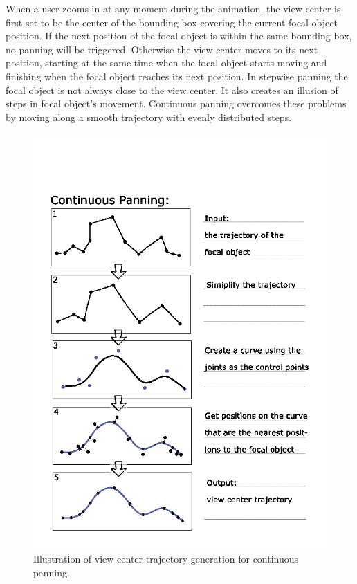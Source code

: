 \documentclass[review]{vgtc}                 %
\begin{document}
When a user zooms in at any moment during the animation, the view center is first set to be the center of the bounding box covering the current focal object position. If the next position of the focal object is within the same bounding box, no panning will be triggered. Otherwise the view center moves to its next position, starting at the same time when the focal object starts moving and finishing when the focal object reaches its next position. In stepwise panning the focal object is not always close to the view center. It also creates an illusion of steps in focal object's movement. Continuous panning overcomes these problems by moving along a smooth trajectory with evenly distributed steps.

\begin{figure}[t]
\centering
\includegraphics[width=\columnwidth]{follow2}
\caption{Illustration of view center trajectory generation for continuous panning.}
\label{fig:follow2}
\end{figure}
\end{document}
